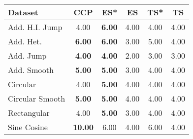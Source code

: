 \begin{tabular}{lccccc}
\toprule
Dataset & CCP & ES* & ES & TS* & TS \\
\midrule
Add. H.I. Jump & 4.00 & \textbf{6.00} & 4.00 & 4.00 & 4.00 \\
Add. Het. & \textbf{6.00} & \textbf{6.00} & 3.00 & 5.00 & 4.00 \\
Add. Jump & \textbf{4.00} & \textbf{4.00} & 2.00 & 3.00 & 3.00 \\
Add. Smooth & \textbf{5.00} & \textbf{5.00} & 3.00 & 4.00 & 4.00 \\
Circular & 4.00 & \textbf{5.00} & 4.00 & 4.00 & 4.00 \\
Circular Smooth & \textbf{5.00} & \textbf{5.00} & 4.00 & 4.00 & 4.00 \\
Rectangular & 4.00 & \textbf{5.00} & 3.00 & 4.00 & 4.00 \\
Sine Cosine & \textbf{10.00} & 6.00 & 4.00 & 6.00 & 4.00 \\
\bottomrule
\end{tabular}